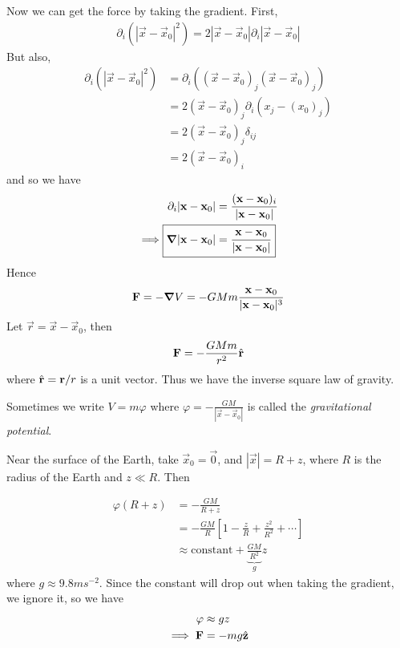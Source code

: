 \documentclass{../../template/note}
\begin{document}
    Now we can get the force by taking the gradient. First,
    \begin{align*}
        \partial_i \left(|\vec x-\vec x_0|^2\right) = 2|\vec x - \vec x_0| \partial_i |\vec x - \vec x_0|
    \end{align*}
    But also,
    \begin{align*}
        \partial_i \left(|\vec x-\vec x_0|^2\right) &= \partial_i \left((\vec x-\vec x_0)_j(\vec x-\vec x_0)_j\right) \\
        &= 2(\vec x - \vec x_0)_j \partial_i(x_j - (x_0)_j) \\
        &= 2(\vec x - \vec x_0)_j \delta_{ij} \\
        &= 2(\vec x - \vec x_0)_i
    \end{align*}
    and so we have
    \begin{align*}
        \partial_i|\vec x - \vec x_0| &= \frac{(\vec x - \vec x_0)_i}{|\vec x - \vec x_0|} \\
        \implies \Aboxed{\grad |\vec x - \vec x_0| &= \frac{\vec x - \vec x_0}{|\vec x - \vec x_0|}}
    \end{align*}
    Hence
    \begin{align*}
        \vec F = -\grad V = -GMm \frac{\vec x - \vec x_0}{|\vec x - \vec x_0|^3}
    \end{align*}
    Let \(\vec r = \vec x - \vec x_0\), then
    \begin{align*}
        \vec F = -\frac{GMm}{r^2} \hvec r
    \end{align*}
    where \(\hvec r = \vec r / r\) is a unit vector. Thus we have the inverse square law of gravity.

    \begin{remark*}
        Sometimes we write \(V = m\varphi\) where \(\varphi = -\frac{GM}{|\vec x - \vec x_0|}\) is called the \emph{gravitational potential}. 
    \end{remark*}
    
    Near the surface of the Earth, take \(\vec x_0 = \vec 0\), and \(|\vec x| = R + z\), where \(R\) is the radius of the Earth and \(z \ll R\). Then

    \begin{align*}
        \varphi(R + z) &= -\frac{GM}{R+z} \\
        &= -\frac{GM}{R}\left[1-\frac{z}{R}+\frac{z^2}{R^2} + \cdots\right] \\
        &\approx \text{constant} + \underbrace{\frac{GM}{R^2}}_{g}z
    \end{align*}
    where \(g \approx 9.8 \si{ms^{-2}}\). Since the constant will drop out when taking the gradient, we ignore it, so we have
    \begin{align*}
        \varphi &\approx gz \\
        \implies \vec F &= -mg \hvec z
    \end{align*}
    
\end{document}
